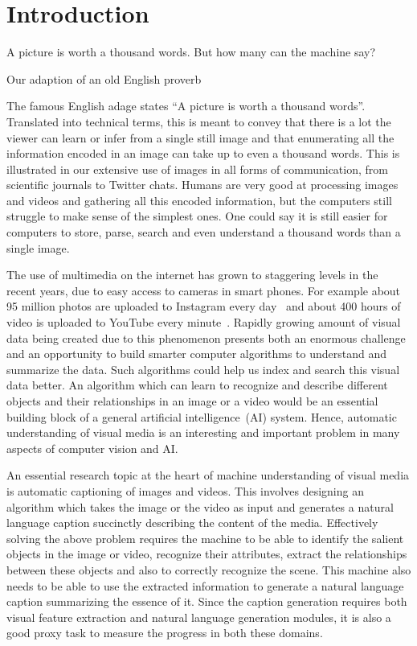 \chapter{Introduction}
\label{chapter:intro}
\setlength{\epigraphwidth}{\textwidth}
\epigraph{A picture is worth a thousand words. But how many can the machine
say?}{Our adaption of an old English proverb}

\noindent The famous English adage states ``A picture is worth a thousand
words''.
Translated into technical terms, this is meant to convey that there is a lot the
viewer can learn or infer from a single still image and that enumerating all the
information encoded in an image can take up to even a thousand words.
This is illustrated in our extensive use of images in all forms of
communication, from scientific journals to Twitter chats. 
%
Humans are very good at processing images and videos and gathering all this
encoded information, but the computers still struggle to make sense of the
simplest ones.
%
One could say it is still easier for computers to store, parse, search and even
understand a thousand words than a single image.
%

The use of multimedia on the internet has grown to staggering levels in the
recent years, due to easy access to cameras in smart phones.
For example about 95 million photos are uploaded to Instagram every
day~\cite{InstStats} and about 400 hours of video is uploaded to YouTube every
minute~\cite{YouStats}.
%
Rapidly growing amount of visual data being created due to this phenomenon
presents both an enormous challenge and an opportunity to build smarter
computer algorithms to understand and summarize the data.
Such algorithms could help us index and search this visual data better.
An algorithm which can learn to recognize and describe different objects and
their relationships in an image or a video would be an essential building block
of a general artificial intelligence~(AI) system.
Hence, automatic understanding of visual media is an interesting and important
problem in many aspects of computer vision and AI.
%

An essential research topic at the heart of machine understanding of visual
media is automatic captioning of images and videos.
This involves designing an algorithm which takes the image or the video as
input and generates a natural language caption succinctly describing the
content of the media.
Effectively solving the above problem requires the machine to be able to
identify the salient objects in the image or video, recognize their attributes,
extract the relationships between these objects and also to correctly recognize
the scene.
This machine also needs to be able to use the extracted information to generate
a natural language caption summarizing the essence of it.
Since the caption generation requires both visual feature extraction and
natural language generation modules, it is also a good proxy task to measure
the progress in both these domains. 

